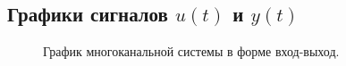 \documentclass[a5paper, 10pt]{article}
\theoremstyle{definition}
\theoremstyle{plain}
\theoremstyle{remark}
\begin{document}
\subsection{Графики сигналов $u(t)$ и $y(t)$}
\begin{figure}[h]
\caption{График многоканальной системы в форме вход-выход.}
\end{figure}
\end{document}
